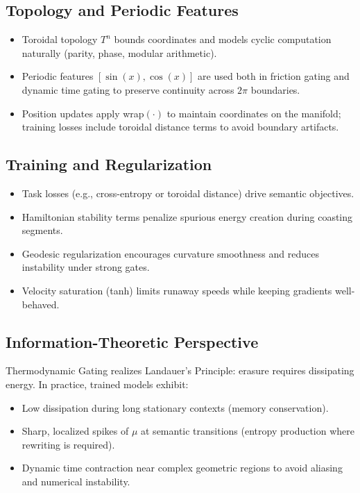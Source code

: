 \documentclass{article}
\numberwithin{equation}{section}
\begin{document}
\subsection{Topology and Periodic Features}
\begin{itemize}
\item Toroidal topology $T^n$ bounds coordinates and models cyclic computation naturally (parity, phase, modular arithmetic).
\item Periodic features $[\sin(x), \cos(x)]$ are used both in friction gating and dynamic time gating to preserve continuity across $2\pi$ boundaries.
\item Position updates apply wrap$(\cdot)$ to maintain coordinates on the manifold; training losses include toroidal distance terms to avoid boundary artifacts.
\end{itemize}

\subsection{Training and Regularization}
\begin{itemize}
\item Task losses (e.g., cross-entropy or toroidal distance) drive semantic objectives.
\item Hamiltonian stability terms penalize spurious energy creation during coasting segments.
\item Geodesic regularization encourages curvature smoothness and reduces instability under strong gates.
\item Velocity saturation (tanh) limits runaway speeds while keeping gradients well-behaved.
\end{itemize}

\subsection{Information-Theoretic Perspective}
Thermodynamic Gating realizes Landauer’s Principle: erasure requires dissipating energy. In practice, trained models exhibit:
\begin{itemize}
\item Low dissipation during long stationary contexts (memory conservation).
\item Sharp, localized spikes of $\mu$ at semantic transitions (entropy production where rewriting is required).
\item Dynamic time contraction near complex geometric regions to avoid aliasing and numerical instability.
\end{itemize}
\end{document}
